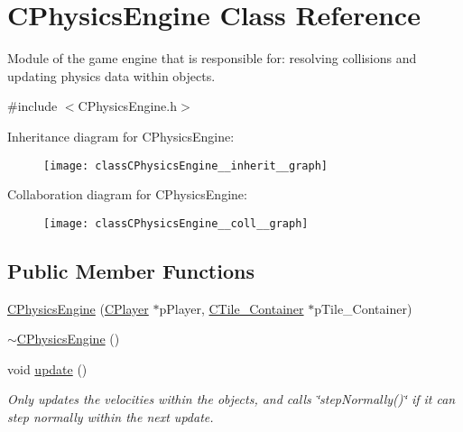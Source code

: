 \hypertarget{classCPhysicsEngine}{\section{C\-Physics\-Engine Class Reference}
\label{classCPhysicsEngine}
}


Module of the game engine that is responsible for\-: resolving collisions and updating physics data within objects.  




{\ttfamily \#include $<$C\-Physics\-Engine.\-h$>$}



Inheritance diagram for C\-Physics\-Engine\-:\nopagebreak
\begin{figure}[H]
\begin{center}
\leavevmode
\texttt{[image: classCPhysicsEngine\_\_inherit\_\_graph]}
\end{center}
\end{figure}


Collaboration diagram for C\-Physics\-Engine\-:\nopagebreak
\begin{figure}[H]
\begin{center}
\leavevmode
\texttt{[image: classCPhysicsEngine\_\_coll\_\_graph]}
\end{center}
\end{figure}
\subsection*{Public Member Functions}
\begin{DoxyCompactItemize}
\item 
\hyperlink{classCPhysicsEngine_ab7a2fa6ebd7e1ad0da2ab36d92ae8608}{C\-Physics\-Engine} (\hyperlink{classCPlayer}{C\-Player} $\ast$p\-Player, \hyperlink{classCTile__Container}{C\-Tile\-\_\-\-Container} $\ast$p\-Tile\-\_\-\-Container)
\item 
\hyperlink{classCPhysicsEngine_a2e432f93b60e9e38a8882223ea3ee71b}{$\sim$\-C\-Physics\-Engine} ()
\item 
void \hyperlink{classCPhysicsEngine_abc493897bbdb15e6787a25478730f1f5}{update} ()
\begin{DoxyCompactList}\small\item\em Only updates the velocities within the objects, and calls \char`\"{}step\-Normally()\char`\"{} if it can step normally within the next update. \end{DoxyCompactList}\end{DoxyCompactItemize}


